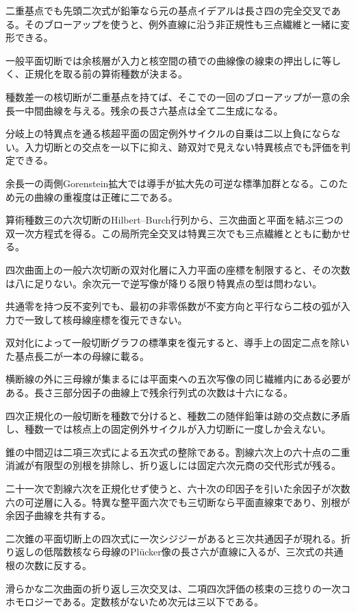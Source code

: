 \documentclass[11pt,a4paper]{ltjsarticle}
\begin{document}
二重基点でも先頭二次式が鉛筆なら元の基点イデアルは長さ四の完全交叉である。そのブローアップを使うと、例外直線に沿う非正規性も三点繊維と一緒に変形できる。

一般平面切断では余核層が入力と核空間の積での曲線像の線束の押出しに等しく、正規化を取る前の算術種数が決まる。

種数差一の核切断が二重基点を持てば、そこでの一回のブローアップが一意の余長一中間曲線を与える。残余の長さ六基点は全て二生成になる。

分岐上の特異点を通る核超平面の固定例外サイクルの自乗は二以上負にならない。入力切断との交点を一以下に抑え、跡双対で見えない特異核点でも評価を判定できる。

余長一の両側Gorenstein拡大では導手が拡大先の可逆な標準加群となる。このため元の曲線の重複度は正確に二である。

算術種数三の六次切断のHilbert--Burch行列から、三次曲面と平面を結ぶ三つの双一次方程式を得る。この局所完全交叉は特異三次でも三点繊維とともに動かせる。

四次曲面上の一般六次切断の双対化層に入力平面の座標を制限すると、その次数は八に足りない。余次元一で逆写像が降りる限り特異点の型は問わない。

共通零を持つ反不変列でも、最初の非零係数が不変方向と平行なら二枝の弧が入力で一致して核母線座標を復元できない。

双対化によって一般切断グラフの標準束を復元すると、導手上の固定二点を除いた基点長二が一本の母線に載る。

横断線の外に三母線が集まるには平面束への五次写像の同じ繊維内にある必要がある。長さ三部分因子の曲線上で残余行列式の次数は十六になる。

四次正規化の一般切断を種数で分けると、種数二の随伴鉛筆は跡の交点数に矛盾し、種数一では核点上の固定例外サイクルが入力切断に一度しか会えない。

錐の中間辺は二項三次式による五次式の整除である。割線六次上の六十点の二重消滅が有限型の別根を排除し、折り返しには固定六次元商の交代形式が残る。

二十一次で割線六次を正規化せず使うと、六十次の印因子を引いた余因子が次数六の可逆層に入る。特異な整平面六次でも三切断なら平面直線束であり、別根が余因子曲線を共有する。

二次錐の平面切断上の四次式に一次シジジーがあると三次共通因子が現れる。折り返しの低階数核なら母線のPlücker像の長さ六が直線に入るが、三次式の共通根の次数に反する。

滑らかな二次曲面の折り返し三次交叉は、二項四次評価の核束の三捻りの一次コホモロジーである。定数核がないため次元は三以下である。
\end{document}
